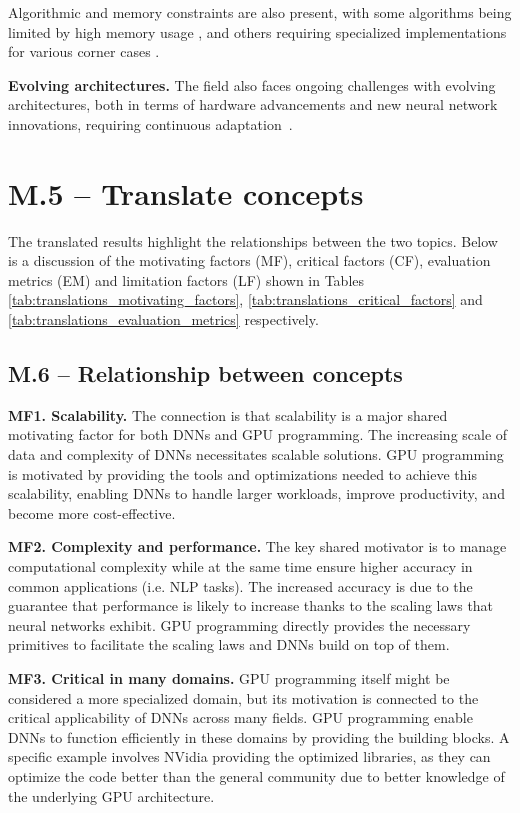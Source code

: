 Algorithmic and memory constraints are also present, with some algorithms being limited by high
memory usage , and others requiring specialized implementations for various corner
cases .

\textbf{Evolving architectures.}
The field also faces ongoing challenges with evolving architectures, both in terms of hardware advancements
and new neural network innovations, requiring continuous adaptation~.

\section{M.5 -- Translate concepts}
\label{sec:translate-concepts}
The translated results highlight the relationships between the two topics. Below is a discussion of
the motivating factors (MF), critical factors (CF), evaluation metrics (EM) and limitation factors
(LF) shown in Tables \ref{tab:translations_motivating_factors},
\ref{tab:translations_critical_factors} and \ref{tab:translations_evaluation_metrics} respectively.

\subsection{M.6 -- Relationship between concepts}

\textbf{MF1. Scalability.}
The connection is that scalability is a major shared motivating factor for both DNNs and GPU programming.
The increasing scale of data and complexity of DNNs necessitates scalable solutions. GPU programming is
motivated by providing the tools and optimizations needed to achieve this scalability, enabling DNNs to
handle larger workloads, improve productivity, and become more cost-effective.

\textbf{MF2. Complexity and performance.}
The key shared motivator is to manage computational complexity while at the same time ensure higher accuracy
in common applications (i.e. NLP tasks). The increased accuracy is due to the guarantee that performance
is likely to increase thanks to the scaling laws that neural networks exhibit.
GPU programming directly provides the necessary primitives to facilitate the scaling laws and DNNs build on top of them.

\textbf{MF3. Critical in many domains.}
GPU programming itself might be considered a more specialized domain, but its motivation is connected to the
critical applicability of DNNs across many fields. GPU programming enable DNNs to function efficiently in
these domains by providing the building blocks. A specific example involves NVidia providing the optimized libraries,
as they can optimize the code better than the general community due to better knowledge of the underlying GPU architecture.

